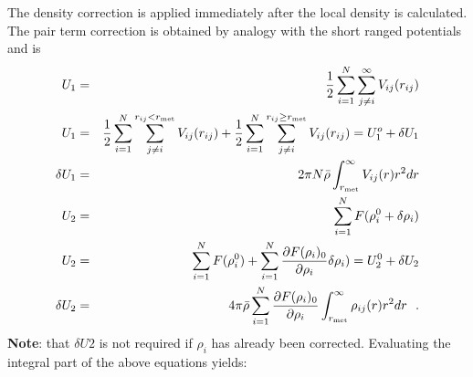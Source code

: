 The density correction is applied immediately after the local
density is calculated.  The pair term correction is obtained by
analogy with the short ranged potentials and is
\begin{eqnarray}
U_{1} &=& {1 \over 2} \sum_{i=1}^{N} \sum_{j \ne i}^{\infty} V_{ij}(r_{ij}) \nonumber \\
U_{1} &=& {1 \over 2} \sum_{i=1}^{N} \sum_{j \ne i}^{r_{ij}<r_{\rm met}} V_{ij}(r_{ij}) +
{1 \over 2} \sum_{i=1}^{N} \sum_{j \ne i}^{r_{ij} \ge r_{\rm met}} V_{ij}(r_{ij}) =
U_{1}^{o} + \delta U_{1} \nonumber \\
\delta U_{1} &=& 2 \pi N \bar{\rho} \int_{r_{\rm met}}^{\infty} V_{ij}(r) r^{2} dr \nonumber \\
U_{2} &=& \sum_{i=1}^{N} F(\rho_{i}^{0} + \delta \rho_{i}) \\
U_{2} &=& \sum_{i=1}^{N} F(\rho_{i}^{0}) +
\sum_{i=1}^{N} \frac{\partial F(\rho_{i})_{0}}{\partial \rho_{i}} \delta \rho_{i}) =
U_{2}^{0} + \delta U_{2} \nonumber \\
\delta U_{2} &=& 4 \pi \bar{\rho} \sum_{i=1}^{N} \frac{\partial F(\rho_{i})_{0}}{\partial \rho_{i}}
\int_{r_{\rm met}}^{\infty} \rho_{ij}(r) r^{2} dr~~. \nonumber
\end{eqnarray}
{\bf Note}: that $\delta U{2}$ is not required if
$\rho_{i}$ has already been corrected.  Evaluating the
integral part of the above equations yields:
